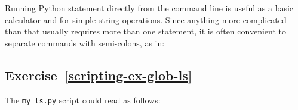 \documentclass[
]{krantz}
\makeatletter
\newenvironment{Shaded}{\begin{snugshade}}{\end{snugshade}}
\newcommand{\NormalTok}[1]{#1}
\newcommand{\OperatorTok}[1]{\textcolor[rgb]{0.81,0.36,0.00}{\textbf{#1}}}
\newcommand{\StringTok}[1]{\textcolor[rgb]{0.31,0.60,0.02}{#1}}
\newenvironment{kframe}{%
\medskip{}
\setlength{\fboxsep}{.8em}
 \def\at@end@of@kframe{}%
 \ifinner\ifhmode%
  \def\at@end@of@kframe{\end{minipage}}%
  \begin{minipage}{\columnwidth}%
 \fi\fi%
 \def\FrameCommand##1{\hskip\@totalleftmargin \hskip-\fboxsep
 \colorbox{shadecolor}{##1}\hskip-\fboxsep
     \hskip-\linewidth \hskip-\@totalleftmargin \hskip\columnwidth}%
 \MakeFramed {\advance\hsize-\width
   \@totalleftmargin\z@ \linewidth\hsize
   \@setminipage}}%
 {\par\unskip\endMakeFramed%
 \at@end@of@kframe}
\renewenvironment{Shaded}{\begin{kframe}}{\end{kframe}}
\makeatother
\begin{document}
Running Python statement directly from the command line is useful as a basic calculator
and for simple string operations.
Since anything more complicated than that usually requires more than one statement,
it is often convenient to separate commands with semi-colons, as in:

\begin{Shaded}
\end{Shaded}

\hypertarget{exercise-refscripting-ex-glob-ls}{%
\subsection*{Exercise~\ref{scripting-ex-glob-ls}}\label{exercise-refscripting-ex-glob-ls}}


The \texttt{my\_ls.py} script could read as follows:
\end{document}
